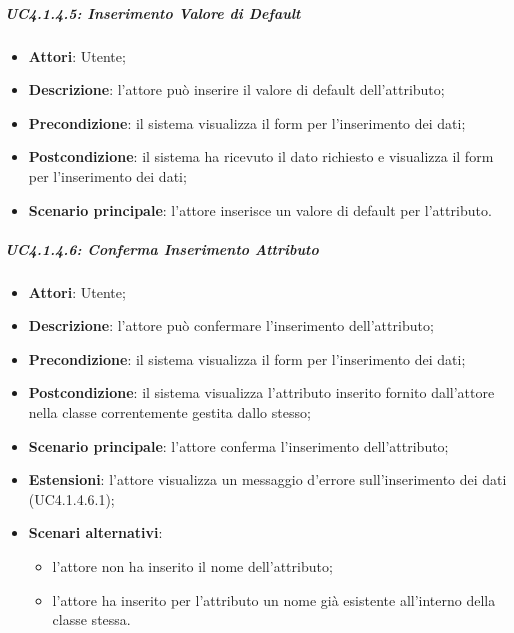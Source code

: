 \subparagraph{UC4.1.4.5: Inserimento Valore di Default}
\label{UC4.1.4.5}
\begin{itemize}
	\item \textbf{Attori}: Utente;
	\item \textbf{Descrizione}: l'attore può inserire il valore di default dell'attributo;
	\item \textbf{Precondizione}: il sistema visualizza il form per l'inserimento dei dati;
	\item \textbf{Postcondizione}: il sistema ha ricevuto il dato richiesto e visualizza il form per l'inserimento dei dati;
	\item \textbf{Scenario principale}: l'attore inserisce un valore di default per l'attributo.
\end{itemize}

\subparagraph{UC4.1.4.6: Conferma Inserimento Attributo}
\label{UC4.1.4.6}
\begin{itemize}
	\item \textbf{Attori}: Utente;
	\item \textbf{Descrizione}: l'attore può confermare l'inserimento dell'attributo;
	\item \textbf{Precondizione}: il sistema visualizza il form per l'inserimento dei dati;
	\item \textbf{Postcondizione}: il sistema visualizza l'attributo inserito fornito dall'attore nella classe correntemente gestita dallo stesso;
	\item \textbf{Scenario principale}: l'attore conferma l'inserimento dell'attributo;
	\item \textbf{Estensioni}: l'attore visualizza un messaggio d'errore sull'inserimento dei dati (UC4.1.4.6.1);
	\item \textbf{Scenari alternativi}:
	\begin{itemize}
		\item l'attore non ha inserito il nome dell'attributo;
		\item l'attore ha inserito per l'attributo un nome già esistente all'interno della classe stessa.
	\end{itemize}
\end{itemize}

